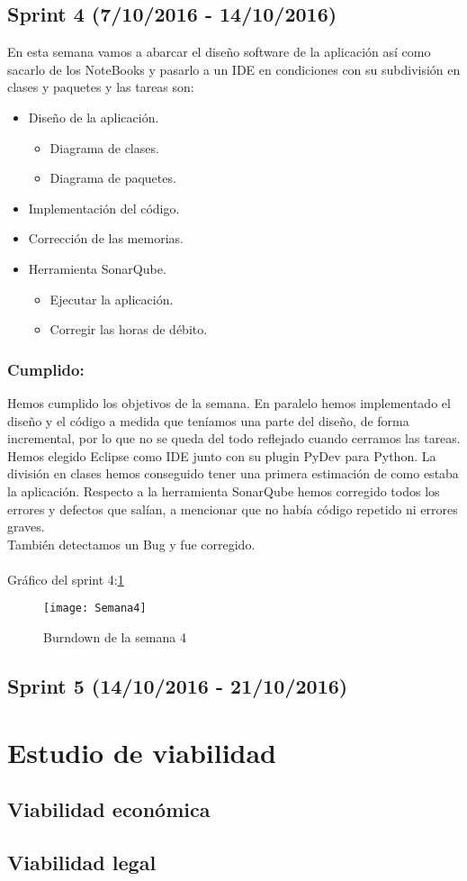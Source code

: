 \subsection{Sprint 4 (7/10/2016 - 14/10/2016)}
En esta semana vamos a abarcar el diseño software de la aplicación así como sacarlo de los NoteBooks y pasarlo a un IDE en condiciones con su subdivisión en clases y paquetes y las tareas son:
\begin{itemize}
	\item Diseño de la aplicación.
		\begin{itemize}
			\item Diagrama de clases.
			\item Diagrama de paquetes.
		\end{itemize}
		
	\item Implementación del código.
		
	\item Corrección de las memorias.
	
	\item Herramienta SonarQube.
	\begin{itemize}
		\item Ejecutar la aplicación.
		\item Corregir las horas de débito.
	\end{itemize}
\end{itemize}
\subsubsection{Cumplido:}
Hemos cumplido los objetivos de la semana.
En paralelo hemos implementado el diseño y el código a medida que teníamos una parte del diseño, de forma incremental, por lo que no se queda del todo reflejado cuando cerramos las tareas.\\
Hemos elegido Eclipse como IDE junto con su plugin PyDev para Python.
La división en clases hemos conseguido tener una primera estimación de como estaba la aplicación.
Respecto a la herramienta SonarQube hemos corregido todos los errores y defectos que salían, a mencionar que no había código repetido ni errores graves.\\
También detectamos un Bug y fue corregido.\\\\
Gráfico del sprint 4:\ref{fig:A.2.4}
\begin{figure}[h]
\centering
\texttt{[image: Semana4]}
\caption{Burndown de la semana 4}
\label{fig:A.2.4}
\end{figure}

\subsection{Sprint 5 (14/10/2016 - 21/10/2016)}


\section{Estudio de viabilidad}

\subsection{Viabilidad económica}

\subsection{Viabilidad legal}


